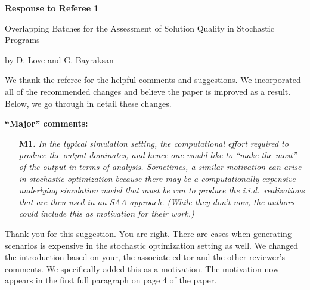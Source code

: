 \documentclass[11pt,notitlepage,onecolumn]{article}
\newcommand{\noi}{\noindent}
\begin{document}

\singlespacing

\baselineskip0.26in


\pagebreak

\begin{center}
\textbf{\Large Response to Referee 1} 
\medskip

{\large Overlapping Batches for the Assessment of Solution Quality in Stochastic Programs}
\medskip

{\footnotesize by D. Love and G. Bayraksan}
\end{center}

\bigskip

\bigskip


We thank the referee for the helpful comments and suggestions. 
We incorporated all of the recommended changes and believe the paper is improved as a result. 
Below, we go through in detail these changes. 
\medskip

\bigskip 


\noi  
{\large \bf ``Major'' comments:}
\medskip 

\begin{itemize}
\item[\textbf{M1.}] \textit{In the typical simulation setting, the computational effort required to produce the output dominates, and hence one would like to ``make the most'' of the output in terms of analysis. 
Sometimes, a similar motivation can arise in stochastic optimization because there may be a computationally expensive underlying simulation model that must be run to produce the i.i.d.\ realizations that are then used in an SAA approach. 
(While they don't now, the authors could include this as motivation for
their work.)}
\end{itemize}

\noi
Thank you for this suggestion. 
You are right.
There are cases when generating scenarios is expensive in the stochastic optimization setting as well. 
We changed the introduction based on your, the associate editor and the other reviewer's comments. 
We specifically added this as a motivation. 
The motivation now appears in the first full paragraph on page 4 of the paper. 
\medskip
\end{document}
